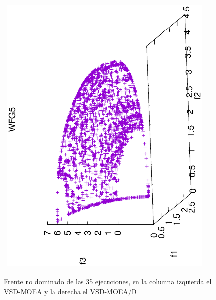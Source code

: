 \begin{figure}[H]
\centering
\scriptsize
\caption{Frente no dominado de las 35 ejecuciones, en la columna izquierda el VSD-MOEA y la derecha el VSD-MOEA/D}%
\begin{tabular}{cc}
  \includegraphics[scale=0.3, angle=-90,origin=c]{Figures_Chapter7/Results_Chapter4/Summary_Representative/VSD-MOEA/WFG5.eps} &

\end{tabular}
\end{figure}
